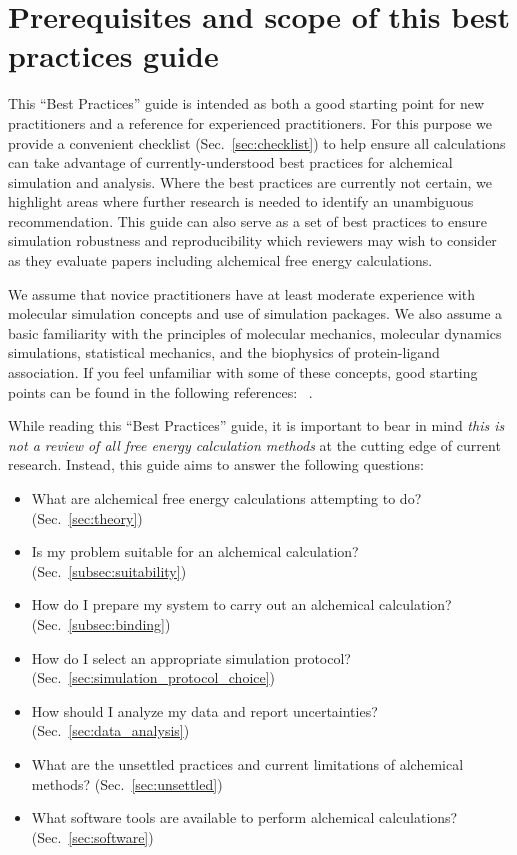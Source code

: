 \documentclass[9pt,bestpractices]{livecoms}
\begin{document}
\section{Prerequisites and scope of this best practices guide}
\label{sec:pre}

This ``Best Practices'' guide is intended as both a good starting point for new practitioners and a reference for experienced practitioners. 
For this purpose we provide a convenient checklist (Sec.~\ref{sec:checklist}) to help ensure all calculations can take advantage of currently-understood best practices for alchemical simulation and analysis. Where the best practices are currently not certain, we highlight areas where further research is needed to identify an unambiguous recommendation.
This guide can also serve as a set of best practices to ensure simulation robustness and reproducibility which reviewers may wish to consider as they evaluate papers including alchemical free energy calculations.

We assume that novice practitioners have at least moderate experience with molecular simulation concepts and use of simulation packages. 
We also assume a basic familiarity with the principles of molecular mechanics, molecular dynamics simulations, statistical mechanics, and the biophysics of protein-ligand association. If you feel unfamiliar with some of these concepts, good starting points can be found in the following references: ~\cite{braun2019best, grossfield2018best, klimovich2015guidelines, shirts2012best, FEmethods_review2020}. 

 While reading this ``Best Practices'' guide, it is important to bear in mind \emph{this is not a review of all free energy calculation methods} at the cutting edge of current research.
Instead, this guide aims to answer the following questions:
\begin{itemize}
     \item What are alchemical free energy calculations attempting to do? (Sec.~\ref{sec:theory})
     \item Is my problem suitable for an alchemical calculation? (Sec.~\ref{subsec:suitability}) 
     \item How do I prepare my system to carry out an alchemical calculation? (Sec.~\ref{subsec:binding})
     \item How do I select an appropriate simulation protocol? (Sec.~\ref{sec:simulation_protocol_choice})
     \item How should I analyze my data and report uncertainties? (Sec.~\ref{sec:data_analysis})
     \item What are the unsettled practices and current limitations of alchemical methods? (Sec.~\ref{sec:unsettled})
     \item What software tools are available to perform alchemical calculations? (Sec.~\ref{sec:software}) 
\end{itemize}
\end{document}

